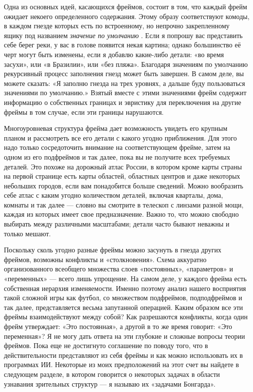 \documentclass[../main.tex]{subfiles}
\begin{document}
Одна из основных идей, касающихся фреймов, состоит в том, что каждый фрейм ожидает некоего определенного содержания. Этому образу соответствуют комоды, в каждом гнезде которых есть по встроенному, но непрочно закрепленному ящику под названием \emph{значение по умолчанию} . Если я попрошу вас представить себе берег реки, у вас в голове появится некая картина; однако большинство её черт могут быть изменены, если я добавлю какие-либо детали: «во время засухи», или «в Бразилии», или «без пляжа». Благодаря значениям по умолчанию рекурсивный процесс заполнения гнезд может быть завершен. В самом деле, вы можете сказать: «Я заполню гнезда на трех уровнях, а дальше буду пользоваться значениями по умолчанию.» Взятый вместе с этими значениями фрейм содержит информацию о собственных границах и эвристику для переключения на другие фреймы в том случае, если эти границы нарушаются.

Многоуровневая структура фрейма дает возможность увидеть его крупным планом и рассмотреть все его детали с какого угодно приближения. Для этого надо только сосредоточить внимание на соответствующем фрейме, затем на одном из его подфреймов и так далее, пока вы не получите всех требуемых деталей. Это похоже на дорожный атлас России, в котором кроме карты страны на первой странице есть карты областей, областных центров и даже некоторых небольших городов, если вам понадобится больше сведений. Можно вообразить себе атлас с каким угодно количеством деталей, включая кварталы, дома, комнаты и так далее --- словно вы смотрите в телескоп с линзами разной мощи, каждая из которых имеет свое предназначение. Важно то, что можно свободно выбирать между различными масштабами; детали часто бывают неважны и только мешают.

Поскольку сколь угодно разные фреймы можно засунуть в гнезда других фреймов, возможны конфликты и «столкновения». Схема аккуратно организованного всеобщего множества слоев «постоянных», «параметров» и «переменных» --- всего лишь упрощение. На самом деле, у каждого фрейма есть собственная иерархия изменяемости. Именно поэтому анализ нашего восприятия такой сложной игры как футбол, со множеством подфреймов, подподфреймов и так далее, представляется весьма запутанной операцией. Каким образом все эти фреймы взаимодействуют между собой? Как разрешаются конфликты, когда один фрейм утверждает: «Это постоянная», а другой в то же время говорит: «Это переменная»? Я не могу дать ответа на эти глубокие и сложные вопросы теории фреймов. Пока еще не достигнуто соглашение по поводу того, что в действительности представляют из себя фреймы и как можно использовать их в программах ИИ\@. Некоторые из моих предположений на этот счет вы найдете в следующем разделе, в котором говорится о некоторых задачах в области узнавания зрительных структур --- я называю их «задачами Бонгарда».
\end{document}
